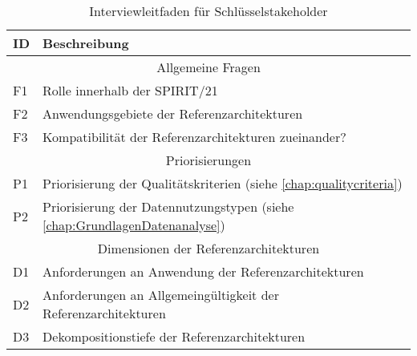 \begin{table}[H]
\centering
\begin{tabular}{|l|l|}
\hline
ID & Beschreibung \\ \hline
\multicolumn{2}{|c|}{\cellcolor[HTML]{ECF4FF}Allgemeine Fragen} \\ \hline
F1 & Rolle innerhalb der SPIRIT/21 \\ \hline
F2 & Anwendungsgebiete der Referenzarchitekturen \\ \hline
F3 & Kompatibilität der Referenzarchitekturen zueinander? \\ \hline
\multicolumn{2}{|c|}{\cellcolor[HTML]{ECF4FF}Priorisierungen} \\ \hline
P1 & Priorisierung der Qualitätskriterien (siehe \autoref{chap:qualitycriteria}) \\ \hline
P2 & Priorisierung der Datennutzungstypen (siehe \autoref{chap:GrundlagenDatenanalyse}) \\ \hline
\multicolumn{2}{|c|}{\cellcolor[HTML]{ECF4FF}Dimensionen der Referenzarchitekturen} \\ \hline
D1 & Anforderungen an Anwendung der Referenzarchitekturen \\ \hline
D2 & Anforderungen an Allgemeingültigkeit der Referenzarchitekturen \\ \hline
D3 & Dekompositionstiefe der Referenzarchitekturen \\ \hline
\end{tabular}
\caption{Interviewleitfaden für Schlüsselstakeholder}
\label{tab:intervieleitfaden}
\end{table}


